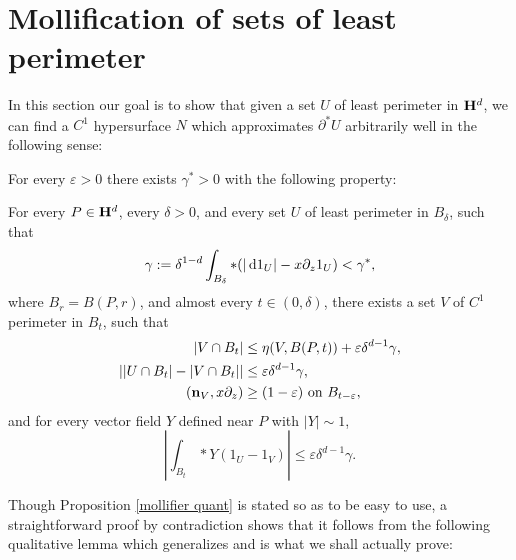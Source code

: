 \section{Mollification of sets of least perimeter}\label{MollifierSection}
In this section our goal is to show that given a set $U$ of least perimeter in $\mathbf H^d$, we can find a $C^1$ hypersurface $N$ which approximates $\partial^* U$ arbitrarily well in the following sense:

\begin{proposition}\label{mollifier quant}
    For every $\varepsilon > 0$ there exists $\gamma^* > 0$ with the following property:
    
    For every $P \in \mathbf H^d$, every $\delta > 0$, and every set $U$ of least perimeter in $B_\delta$, such that
    \begin{equation}\label{bootstrap the mollifier}
    \gamma := \delta^{1 - d}\int_{B_\delta} *(|\mathop{}\!\mathrm{d} 1_U| - x\partial_z 1_U) < \gamma^*,
    \end{equation}
    where $B_r = B(P, r)$, and almost every $t \in (0, \delta)$, there exists a set $V$ of $C^1$ perimeter in $B_t$, such that
    \begin{align}
    |V \cap B_t| &\leq \eta(V, B(P, t)) + \varepsilon \delta^{d - 1} \gamma, \label{mollifier quant1}\\
    \left||U \cap B_t| - |V \cap B_t|\right| &\leq \varepsilon \delta^{d - 1} \gamma, \label{mollifier quant2}\\
    (\mathbf n_V, x\partial_z) &\geq (1 - \varepsilon) \text{ on } B_{t-\varepsilon}, \label{mollifier quant4}
    \end{align}
    and for every vector field $Y$ defined near $P$ with $|Y| \sim 1$,
    \begin{equation}
    \left|\int_{B_t} *Y(1_U - 1_V)\right| \leq \varepsilon \delta^{d - 1} \gamma. \label{mollifier quant3}
    \end{equation}
\end{proposition}

Though Proposition \ref{mollifier quant} is stated so as to be easy to use, a straightforward proof by contradiction shows that it follows from the following qualitative lemma which generalizes \cite[Lemma 5.5]{Miranda66} and is what we shall actually prove:

